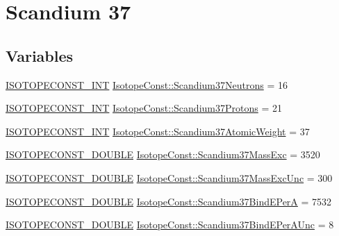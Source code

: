 \hypertarget{group___isotope_const-_scandium-_sc37}{}\section{Scandium 37}
\label{group___isotope_const-_scandium-_sc37}
\subsection*{Variables}
\begin{DoxyCompactItemize}
\item 
\mbox{\hyperlink{group___isotope_const-_macros_ga5f18360b3e99483a35c32d789e62621c}{I\+S\+O\+T\+O\+P\+E\+C\+O\+N\+S\+T\+\_\+\+I\+NT}} \mbox{\hyperlink{group___isotope_const-_scandium-_sc37_ga10ad7c128c0e0db0edc9da3318bac546}{Isotope\+Const\+::\+Scandium37\+Neutrons}} = 16
\item 
\mbox{\hyperlink{group___isotope_const-_macros_ga5f18360b3e99483a35c32d789e62621c}{I\+S\+O\+T\+O\+P\+E\+C\+O\+N\+S\+T\+\_\+\+I\+NT}} \mbox{\hyperlink{group___isotope_const-_scandium-_sc37_ga5d2370966fe210866e46ecfaac3f0d3f}{Isotope\+Const\+::\+Scandium37\+Protons}} = 21
\item 
\mbox{\hyperlink{group___isotope_const-_macros_ga5f18360b3e99483a35c32d789e62621c}{I\+S\+O\+T\+O\+P\+E\+C\+O\+N\+S\+T\+\_\+\+I\+NT}} \mbox{\hyperlink{group___isotope_const-_scandium-_sc37_gaee4bbc6b58fa600ece463fe630b78a34}{Isotope\+Const\+::\+Scandium37\+Atomic\+Weight}} = 37
\item 
\mbox{\hyperlink{group___isotope_const-_macros_ga8f45a7272ce02c0b4c65c44636ed719a}{I\+S\+O\+T\+O\+P\+E\+C\+O\+N\+S\+T\+\_\+\+D\+O\+U\+B\+LE}} \mbox{\hyperlink{group___isotope_const-_scandium-_sc37_gadbcbe5695550bf916b54b101309291f2}{Isotope\+Const\+::\+Scandium37\+Mass\+Exc}} = 3520
\item 
\mbox{\hyperlink{group___isotope_const-_macros_ga8f45a7272ce02c0b4c65c44636ed719a}{I\+S\+O\+T\+O\+P\+E\+C\+O\+N\+S\+T\+\_\+\+D\+O\+U\+B\+LE}} \mbox{\hyperlink{group___isotope_const-_scandium-_sc37_ga6daf3b015372b70789671bd534ad0486}{Isotope\+Const\+::\+Scandium37\+Mass\+Exc\+Unc}} = 300
\item 
\mbox{\hyperlink{group___isotope_const-_macros_ga8f45a7272ce02c0b4c65c44636ed719a}{I\+S\+O\+T\+O\+P\+E\+C\+O\+N\+S\+T\+\_\+\+D\+O\+U\+B\+LE}} \mbox{\hyperlink{group___isotope_const-_scandium-_sc37_ga2c5c1fa26c39ecf9916c7309d2831a75}{Isotope\+Const\+::\+Scandium37\+Bind\+E\+PerA}} = 7532
\item 
\mbox{\hyperlink{group___isotope_const-_macros_ga8f45a7272ce02c0b4c65c44636ed719a}{I\+S\+O\+T\+O\+P\+E\+C\+O\+N\+S\+T\+\_\+\+D\+O\+U\+B\+LE}} \mbox{\hyperlink{group___isotope_const-_scandium-_sc37_gace2f91c58e045672bfd893ffe65cf40e}{Isotope\+Const\+::\+Scandium37\+Bind\+E\+Per\+A\+Unc}} = 8

\end{DoxyCompactItemize}
